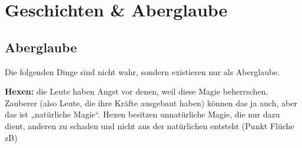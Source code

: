 \section{Geschichten \& Aberglaube}
\subsection{Aberglaube}
Die folgenden Dinge sind nicht wahr, sondern existieren nur als Aberglaube.
\begin{outline}
	\1 \textbf{Hexen:} die Leute haben Angst vor denen, weil diese Magie beherrschen. Zauberer (also Leute, die ihre Kräfte ausgebaut haben) können das ja auch, aber das ist „natürliche Magie“. Hexen besitzen unnatürliche Magie, die nur dazu dient, anderen zu schaden und nicht aus der natürlichen entsteht (Punkt Flüche zB)
\end{outline}